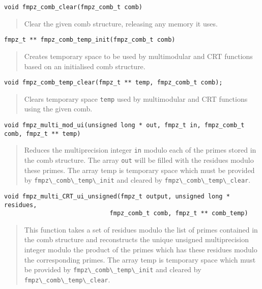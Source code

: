\documentclass[a4paper,10pt]{article}
\newcommand{\code}{\lstinline}
\begin{document}
\begin{lstlisting}
void fmpz_comb_clear(fmpz_comb_t comb) 
\end{lstlisting}
\begin{quote}
Clear the given comb structure, releasing any memory it uses. 
\end{quote}

\begin{lstlisting}
fmpz_t ** fmpz_comb_temp_init(fmpz_comb_t comb)
\end{lstlisting}
\begin{quote}
Creates temporary space to be used by multimodular and CRT functions based on an initialised comb structure.
\end{quote}

\begin{lstlisting}
void fmpz_comb_temp_clear(fmpz_t ** temp, fmpz_comb_t comb);
\end{lstlisting}
\begin{quote}
Clears temporary space \code{temp} used by multimodular and CRT functions using the given comb.
\end{quote}

\begin{lstlisting}
void fmpz_multi_mod_ui(unsigned long * out, fmpz_t in, fmpz_comb_t comb, fmpz_t ** temp)
\end{lstlisting}
\begin{quote}
Reduces the multiprecision integer \code{in} modulo each of the primes stored in the comb structure. The array \code{out} will be filled with the residues modulo these primes. The array temp is temporary space which must be provided by \code{fmpz\_comb\_temp\_init} and cleared by \code{fmpz\_comb\_temp\_clear}.
\end{quote}

\begin{lstlisting}
void fmpz_multi_CRT_ui_unsigned(fmpz_t output, unsigned long * residues, 
                             fmpz_comb_t comb, fmpz_t ** comb_temp)
\end{lstlisting}
\begin{quote}
This function takes a set of residues modulo the list of primes contained in the comb structure and reconstructs the unique unsigned multiprecision integer modulo the product of the primes which has these residues modulo the corresponding primes. The array temp is temporary space which must be provided by \code{fmpz\_comb\_temp\_init} and cleared by \code{fmpz\_comb\_temp\_clear}. 
\end{quote}
\end{document}

